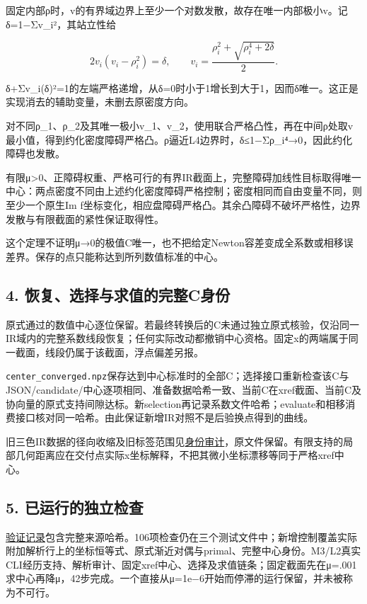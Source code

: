 \documentclass[
  10pt,
  a4paper,
]{article}
\begin{document}
固定内部ρ时，v的有界域边界上至少一个对数发散，故存在唯一内部极小v。记δ=1−Σv\_i²，其站立性给

\[
 2v_i(v_i-\rho_i^2)=\delta,\qquad
 v_i=\frac{\rho_i^2+\sqrt{\rho_i^4+2\delta}}2.
\]

δ+Σv\_i(δ)²=1的左端严格递增，从δ=0时小于1增长到大于1，因而δ唯一。这正是实现消去的辅助变量，未删去原密度方向。

对不同ρ\_1、ρ\_2及其唯一极小v\_1、v\_2，使用联合严格凸性，再在中间ρ处取v最小值，得到约化密度障碍严格凸。ρ逼近L4边界时，δ≤1−Σρ\_i⁴→0，因此约化障碍也发散。

有限μ\textgreater0、正障碍权重、严格可行的有界IR截面上，完整障碍加线性目标取得唯一中心：两点密度不同由上述约化密度障碍严格控制；密度相同而自由变量不同，则至少一个原生Im
f坐标变化，相应盘障碍严格凸。其余凸障碍不破坏严格性，边界发散与有限截面的紧性保证取得性。

这个定理不证明μ→0的极值C唯一，也不把给定Newton容差变成全系数或相移误差界。保存的点只能称达到所列数值标准的中心。

\subsection{4.
恢复、选择与求值的完整C身份}\label{ux6062ux590dux9009ux62e9ux4e0eux6c42ux503cux7684ux5b8cux6574cux8eabux4efd}

原式通过的数值中心逐位保留。若最终转换后的C未通过独立原式核验，仅沿同一IR域内的完整系数线段恢复；任何实际改动都撤销中心资格。固定x的两端属于同一截面，线段仍属于该截面，浮点偏差另报。

\texttt{center\_converged.npz}保存达到中心标准时的全部C；选择接口重新检查该C与JSON/candidate/中心逐项相同、准备数据哈希一致、当前C在xref截面、当前C及协向量的原式支持间隙达标。新selection再记录系数文件哈希；evaluate和相移消费接口核对同一哈希。由此保证新增IR对照不是后验换点得到的曲线。

旧三色IR数据的径向收缩及旧标签范围见\href{../../../IR_CENTER_IDENTITY_REVIEW_ZH.md}{身份审计}，原文件保留。有限支持的局部几何距离应在交付点实际x坐标解释，不把其微小坐标漂移等同于严格xref中心。

\subsection{5.
已运行的独立检查}\label{ux5df2ux8fd0ux884cux7684ux72ecux7acbux68c0ux67e5}

\href{../../../verification_IR_slice.json}{验证记录}包含完整来源哈希。106项检查仍在三个测试文件中；新增控制覆盖实际附加解析行上的坐标恒等式、原式渐近对偶与primal、完整中心身份。M3/L2真实CLI经历支持、解析审计、固定xref中心、选择及求值链条；固定截面先在μ=.001求中心再降μ，42步完成。一个直接从μ=1e−6开始而停滞的运行保留，并未被称为不可行。
\end{document}

